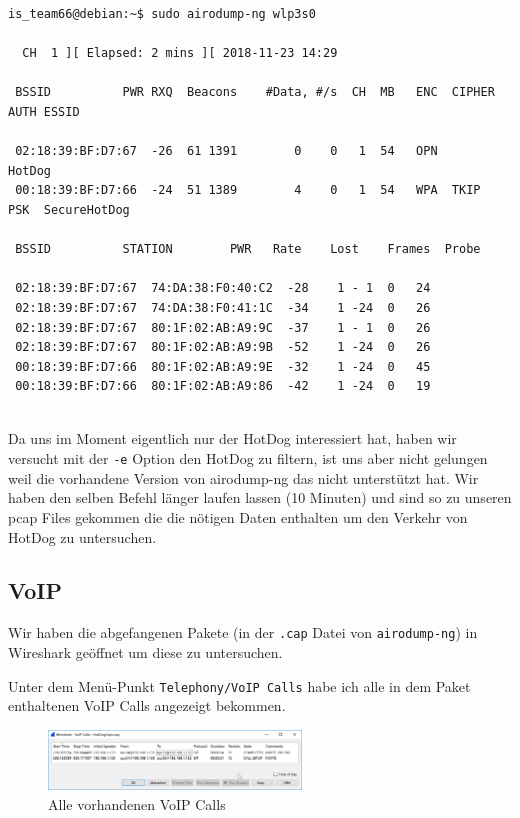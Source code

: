 \documentclass[12pt,a4paper,titlepage,oneside]{scrartcl}
\begin{document}
\begin{lstlisting}
is_team66@debian:~$ sudo airodump-ng wlp3s0

  CH  1 ][ Elapsed: 2 mins ][ 2018-11-23 14:29

 BSSID		    PWR RXQ  Beacons	#Data, #/s  CH	MB   ENC  CIPHER AUTH ESSID

 02:18:39:BF:D7:67  -26  61	1391	    0	 0   1	54   OPN	      HotDog
 00:18:39:BF:D7:66  -24  51	1389	    4	 0   1	54   WPA  TKIP	 PSK  SecureHotDog

 BSSID		    STATION	       PWR   Rate    Lost    Frames  Probe

 02:18:39:BF:D7:67  74:DA:38:F0:40:C2  -28    1 - 1	 0	 24
 02:18:39:BF:D7:67  74:DA:38:F0:41:1C  -34    1 -24	 0	 26
 02:18:39:BF:D7:67  80:1F:02:AB:A9:9C  -37    1 - 1	 0	 26
 02:18:39:BF:D7:67  80:1F:02:AB:A9:9B  -52    1 -24	 0	 26
 00:18:39:BF:D7:66  80:1F:02:AB:A9:9E  -32    1 -24	 0	 45
 00:18:39:BF:D7:66  80:1F:02:AB:A9:86  -42    1 -24	 0	 19
 
\end{lstlisting}

Da uns im Moment eigentlich nur der HotDog interessiert hat, haben wir versucht mit der \lstinline{-e} Option den HotDog zu filtern, ist uns aber nicht gelungen weil die vorhandene Version von airodump-ng das nicht unterstützt hat.
Wir haben den selben Befehl länger laufen lassen (10 Minuten) und sind so zu unseren pcap Files gekommen die die nötigen Daten enthalten um den Verkehr von HotDog zu untersuchen.

\subsection{VoIP}

Wir haben die abgefangenen Pakete (in der \lstinline{.cap} Datei von \lstinline{airodump-ng}) in Wireshark geöffnet um diese zu untersuchen.

Unter dem Menü-Punkt \lstinline{Telephony/VoIP Calls} habe ich alle in dem Paket enthaltenen VoIP Calls angezeigt bekommen.

\begin{figure}[h!]
  \centering
    \includegraphics[width=0.6\textwidth]{./imgs/intranet_screenshots/ws_voipcalls_wnd.png}
  \caption{Alle vorhandenen VoIP Calls}
  \label{fig:allvoipcalls}
\end{figure}
\end{document}
